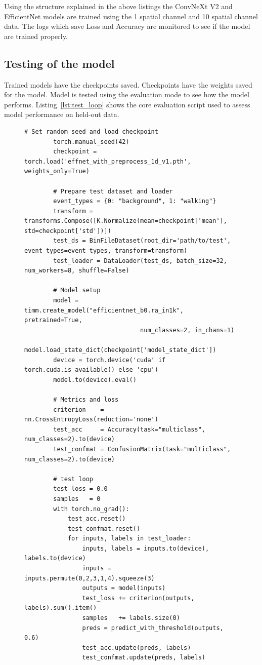 Using the structure explained in the above listings the ConvNeXt V2 and EfficientNet models are trained using the 1 spatial channel and 10 spatial channel data. The logs which save Loss and Accuracy are monitored to see if the model are trained properly.  

\subsection{Testing of the model}
Trained models have the checkpoints saved. Checkpoints have the weights saved for the model. Model is tested using the evaluation mode to see how the model performs. Listing~\ref{lst:test_loop} shows the core evaluation script used to assess model performance on held-out data.

\begin{figure}[htbp]
  \centering
  \begin{minipage}{\linewidth}
    \begin{lstlisting}[style=pythonstyle, caption={Model test script}, label=lst:test_loop]
        # Set random seed and load checkpoint
        torch.manual_seed(42)
        checkpoint = torch.load('effnet_with_preprocess_1d_v1.pth', weights_only=True)
        
        # Prepare test dataset and loader
        event_types = {0: "background", 1: "walking"}
        transform = transforms.Compose([K.Normalize(mean=checkpoint['mean'], std=checkpoint['std'])])
        test_ds = BinFileDataset(root_dir='path/to/test', event_types=event_types, transform=transform)
        test_loader = DataLoader(test_ds, batch_size=32, num_workers=8, shuffle=False)
        
        # Model setup
        model = timm.create_model("efficientnet_b0.ra_in1k", pretrained=True,
                                num_classes=2, in_chans=1)
        model.load_state_dict(checkpoint['model_state_dict'])
        device = torch.device('cuda' if torch.cuda.is_available() else 'cpu')
        model.to(device).eval()
        
        # Metrics and loss
        criterion    = nn.CrossEntropyLoss(reduction='none')
        test_acc     = Accuracy(task="multiclass", num_classes=2).to(device)
        test_confmat = ConfusionMatrix(task="multiclass", num_classes=2).to(device)
        
        # test loop
        test_loss = 0.0
        samples   = 0
        with torch.no_grad():
            test_acc.reset()
            test_confmat.reset()
            for inputs, labels in test_loader:
                inputs, labels = inputs.to(device), labels.to(device)
                inputs = inputs.permute(0,2,3,1,4).squeeze(3)
                outputs = model(inputs)
                test_loss += criterion(outputs, labels).sum().item()
                samples   += labels.size(0)
                preds = predict_with_threshold(outputs, 0.6)
                test_acc.update(preds, labels)
                test_confmat.update(preds, labels)
        

\end{lstlisting}
\end{minipage}
\end{figure}
